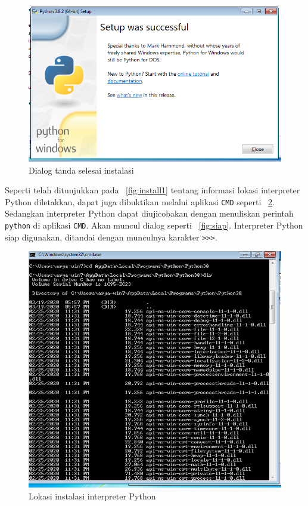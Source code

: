 \begin{figure}[h!]
  \begin{center}
    \includegraphics[scale=.5]{pics/installFinished.png}
    \caption{Dialog tanda selesai instalasi}
    \label{fig:finish}
  \end{center}
\end{figure}

Seperti telah ditunjukkan pada \figurename~\ref{fig:install1} tentang informasi lokasi interpreter Python diletakkan, dapat juga dibuktikan melalui aplikasi \texttt{CMD} seperti \figurename~\ref{fig:lokasi}. Sedangkan interpreter Python dapat diujicobakan dengan menuliskan perintah \texttt{python} di aplikasi \texttt{CMD}. Akan muncul dialog seperti \figurename~\ref{fig:siap}. Interpreter Python siap digunakan, ditandai dengan munculnya karakter \texttt{>>>}.

\begin{figure}[h!]
  \begin{center}
    \includegraphics[scale=.5]{pics/installedLocation.png}
    \caption{Lokasi instalasi interpreter Python}
    \label{fig:lokasi}
  \end{center}
\end{figure}

